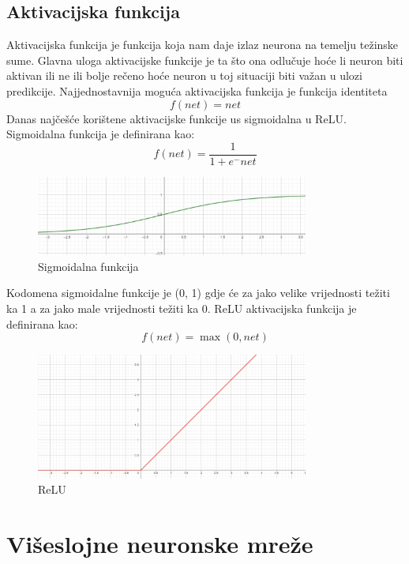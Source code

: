 \subsection{Aktivacijska funkcija}\label{subsec:aktivacijska-funkcija}
Aktivacijska funkcija je funkcija koja nam daje izlaz neurona na temelju težinske sume.
Glavna uloga aktivacijske funkcije je ta što ona odlučuje hoće li neuron biti aktivan ili ne ili bolje rečeno hoće neuron u toj situaciji biti
važan u ulozi predikcije.
Najjednostavnija moguća aktivacijska funkcija je funkcija identiteta
\[ f(\textit{net}) = net \]
Danas najčešće korištene aktivacijske funkcije us sigmoidalna u ReLU.
Sigmoidalna funkcija je definirana kao:
\[ f(\textit{net}) = \frac{1}{1 + e^-net} \]
\FloatBarrier
\begin{figure}[h]
    \centering
    \includegraphics[width=0.8\textwidth]{images/Sigmoid}
    \caption{Sigmoidalna funkcija}
    \label{fig:slika2}
\end{figure}
Kodomena sigmoidalne funkcije je (0, 1) gdje će za jako velike vrijednosti težiti ka 1 a za jako male vrijednosti težiti ka 0.
ReLU aktivacijska funkcija je definirana kao:
\[ f(\textit{net}) = \max(0, \textit{net}) \]
\FloatBarrier
\begin{figure}[h]
    \centering
    \includegraphics[width=0.8\textwidth]{images/ReLU}
    \caption{ReLU}
    \label{fig:slika3}
\end{figure}
\FloatBarrier

\section{Višeslojne neuronske mreže}\label{sec:viseslojne-neuronske-mreze}


